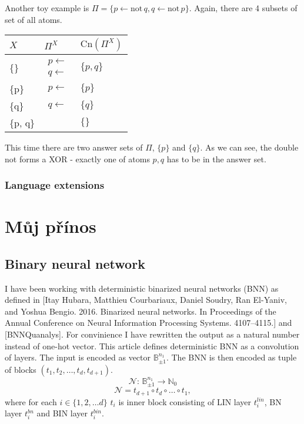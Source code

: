 \documentclass{fithesis}
\newcommand{\BB}{\mathbb{B}}
\newcommand{\NN}{\mathbb{N}}
\newcommand{\BNN}{\mathcal{N}}
\newcommand{\asprule}[2]{#1 \leftarrow #2}
\newcommand{\aspnot}{\mathrm{not}\,}
\begin{document}
Another toy example is $\Pi = \{\asprule{p}{\aspnot q}, \asprule{q}{\aspnot p}\}$.
Again, there are 4 subsets of set of all atoms.
\begin{center}
    \begin{tabular}{l|l|l}
        $X$ & $\Pi^X$ & $\mathrm{Cn}(\Pi^X)$ \\\hline
        \{\} & $\begin{matrix}\asprule{p}{}\\\asprule{q}{}\end{matrix}$ & $\{p, q\}$\\\hline
        \{p\} & $\begin{matrix}\asprule{p}{}\end{matrix}$ & $\{p\}$\\\hline
        \{q\} & $\begin{matrix}\asprule{q}{}\end{matrix}$ & $\{q\}$\\\hline
        \{p, q\} & & $\{\}$
    \end{tabular}
\end{center}
This time there are two answer sets of $\Pi$, $\{p\}$ and $\{q\}$.
As we can see, the double not forms a XOR - exactly one of atoms $p, q$ has to
be in the answer set.

\subsection{Language extensions}


\chapter{Můj přínos}

\section{Binary neural network}

I have been working with deterministic binarized neural networks (BNN)
as defined in [Itay Hubara, Matthieu Courbariaux, Daniel Soudry, Ran El-Yaniv, and Yoshua Bengio. 2016. Binarized neural networks. In Proceedings of the Annual Conference on Neural Information Processing Systems. 4107–4115.] and [BNNQuanalys].
For convinience I have rewritten the output as a natural number instead of
one-hot vector.
This article defines deterministic BNN as a convolution of layers.
The input is
encoded as vector $\BB_{\pm 1}^{n_1}$. The BNN is then encoded as tuple of blocks
$(t_1, t_2, \dots, t_d, t_{d+1})$.
\begin{equation*}
    \BNN: \, \BB_{\pm 1}^{n_1} \to \NN_0
\end{equation*}
\begin{equation}
    \BNN = t_{d+1} \circ t_d \circ \dots \circ t_1,
\end{equation}
where for each $i\in \{1, 2, \dots d\}$ $t_i$ is inner block consisting
of LIN layer $t_i^{lin}$, BN layer $t_i^{bn}$ and BIN layer $t_i^{bin}$.
\end{document}
